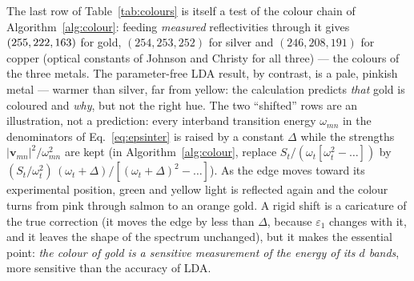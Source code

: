 The last row of Table~\ref{tab:colours} is itself a test of the colour chain of
Algorithm~\ref{alg:colour}: feeding \emph{measured} reflectivities
through it gives
%
 $(255,222,163)$
for gold,
 $(254,253,252)$
for silver and
 $(246,208,191)$
for copper (optical constants of Johnson and Christy for all three) ---
the colours of the three metals. The parameter-free LDA result, by
contrast, is a pale, pinkish metal --- warmer than
silver, far from yellow: the calculation predicts \emph{that} gold is
coloured and \emph{why}, but not the right hue. The two ``shifted'' rows
are an illustration, not a prediction: every interband transition energy
$\omega_{mn}$ in the denominators of Eq.~\eqref{eq:epsinter} is raised by
a constant $\Delta$ while the strengths $|\mathbf v_{mn}|^2/\omega_{mn}^2$
are kept (in Algorithm~\ref{alg:colour}, replace
$S_t/(\omega_t[\omega_t^2-\dots])$ by
$(S_t/\omega_t^2)\,(\omega_t+\Delta)/[(\omega_t+\Delta)^2-\dots]$). As
the edge moves toward its experimental position, green and yellow light
is reflected again and the colour turns from pink through salmon to an
orange gold. A rigid shift is a caricature of the true correction (it
moves the edge by less than $\Delta$, because $\varepsilon_1$ changes
with it, and it leaves the shape of the spectrum unchanged), but it makes
the essential point: \emph{the colour of gold is a sensitive measurement
of the energy of its $d$ bands}, more sensitive than the accuracy of
LDA.


